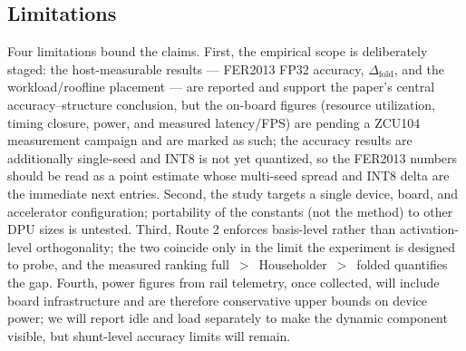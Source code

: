 \documentclass[onecolumn,journal]{IEEEtran}
\begin{document}
\subsection{Limitations}
Four limitations bound the claims. First, the empirical scope is deliberately staged:
the host-measurable results --- FER2013 FP32 accuracy, $\Delta_{\mathrm{fold}}$, and the
workload/roofline placement --- are reported and support the paper's central
accuracy--structure conclusion, but the on-board figures (resource utilization, timing
closure, power, and measured latency/FPS) are pending a ZCU104 measurement campaign and
are marked as such; the accuracy results are additionally single-seed and INT8 is not
yet quantized, so the FER2013 numbers should be read as a point estimate whose
multi-seed spread and INT8 delta are the immediate next entries. Second, the study
targets a single device, board, and accelerator configuration; portability of the
constants (not the method) to other DPU sizes is untested. Third, Route 2 enforces
basis-level rather than activation-level orthogonality; the two coincide only in the
limit the experiment is designed to probe, and the measured ranking
full~$>$~Householder~$>$~folded quantifies the gap. Fourth, power figures from rail
telemetry, once collected, will include board infrastructure and are therefore
conservative upper bounds on device power; we will report idle and load separately to
make the dynamic component visible, but shunt-level accuracy limits will remain.

\end{document}
